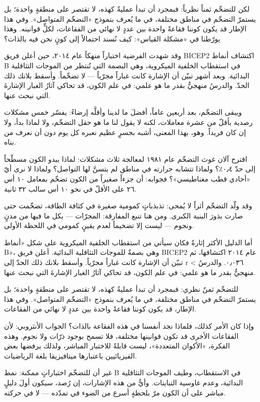 \documentclass[12pt,a4paper,openany]{book}
\begin{document}
لكن للتضخّم ثمناً نظرياً: فبمجرد أن تبدأ عمليةٌ كهذه، لا تقتصر على منطقةٍ واحدة؛ بل يستمرّ التضخّم في مناطق مختلفة، في ما يُعرف بنموذج «التضخّم المتواصل». وفي هذا الإطار قد يكون كوننا فقاعةً واحدة بين عددٍ لا نهائي من الفقاعات، لكلٍّ قوانينه. وهذا يورّطنا في «مشكلة القياس»: كيف نُسند احتمالاً إلى كونٍ نحن فيه بالذات؟


وقد شهدت الفرضية اختباراً منهكاً عام ٢٠١٤، حين أعلن فريق BICEP2 اكتشاف أنماط B في استقطاب الخلفية الميكروية، وهي البصمة التي تُنتظر من الموجات التثاقلية البدائية. وبعد أشهر تبيّن أن الإشارة كانت غباراً مجرّياً — لا تضخّماً. وأسقط بلانك ذلك الحدّ. والدرسُ منهجيٌّ بقدر ما هو علمي: في علم الكون، قد تحاكي آثارُ الغبار الإشارةَ التي نبحث عنها.


ويبقى التضخّم، بعد أربعين عاماً، أفضلَ ما لدينا وأقلَّه إرضاءً: يفسّر خمس مشكلات رصدية بأقلّ من عشرة معاملات، لكنه لا يقول لنا ما هو حقل التضخّم، ولا لماذا بدأ، ولا إن كان فريداً. وهو، بهذا المعنى، أشبه بجسرٍ عظيم نعبره كل يوم دون أن نعرف من بناه.


اقترح آلان غوث التضخّم عام ١٩٨١ لمعالجة ثلاث مشكلات: لماذا يبدو الكون مسطّحاً إلى حدّ ٠٫٤٪؟ ولماذا تتشابه حرارته في مناطق لم يتسنَّ لها التواصل؟ ولماذا لا نرى أيّ «أحادي قطب مغناطيسي»؟ فجوابه: أن جزءاً صغيراً من الكون تضخّم بمعامل ١٠ أس ٢٦ على الأقلّ في نحو ١٠ أس سالب ٣٢ ثانية.


وقد ولّد التضخّم أثراً لا يُمحى: تذبذباتٍ كمومية صغيرة في كثافة الطاقة، تضخّمت حتى صارت بذورَ البنية الكبرى. ومن هنا تنبع المفارقة: المجرّات — بكل ما فيها من مدنٍ ونجوم — ليست إلا تضخيماً لعدم يقينٍ كمومي في اللحظة الأولى.


أما الدليل الأكثر إثارةً فكان سيأتي من استقطاب الخلفية الميكروية على شكل «أنماط B»، وهي بصمةٌ للموجات التثاقلية البدائية. أعلن فريق BICEP2 عام ٢٠١٤ اكتشافها، ثم تبيّن أن الإشارة كانت غباراً مجرّياً. وأسقط بلانك ذلك الحدّ إلى r < ٠٫٠٣٦. والدرسُ منهجيٌّ بقدر ما هو علمي: في علم الكون، قد تحاكي آثارُ الغبار الإشارةَ التي نبحث عنها.


للتضخّم ثمنٌ نظري: فبمجرد أن تبدأ عمليةٌ كهذه، لا تقتصر على منطقةٍ واحدة؛ بل يستمرّ التضخّم في مناطق مختلفة، في ما يُعرف بنموذج «التضخّم المتواصل». وفي هذا الإطار، قد يكون كوننا فقاعةً واحدة بين عددٍ لا نهائي من الفقاعات.


وإذا كان الأمر كذلك، فلماذا نجد أنفسنا في هذه الفقاعة بالذات؟ الجواب الأنثروبي: لأن الفقاعات الأخرى قد تكون قوانينها مختلفة، فلا تسمح بوجود ذرّات ولا نجوم. وهذه الفكرة، «الأكوان المتعددة»، ليست قابلةً للاختبار المباشر، ولذلك يرفضها بعض الفيزيائيين باعتبارها ميتافيزيقا بلغة الرياضيات.


غير أن للتضخّم اختباراتٍ ممكنة: نمط B في الاستقطاب، وطيف الموجات التثاقلية البدائية، وعدم غاوسية التباينات. وأيٌّ من هذه الإشارات، إن رُصد، سيكون أولَ دليلٍ مباشر على أن الكون مرّ بلحظةٍ أسرع من الضوء في تمدّده — لا في حركته.
\end{document}
